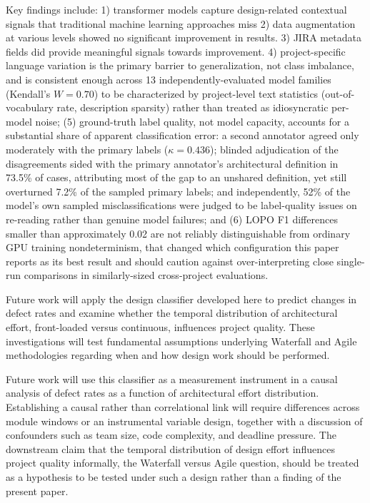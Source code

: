 \documentclass[preprint,12pt]{elsarticle}
\begin{document}
Key findings include: 1) transformer models capture design-related contextual signals that traditional machine learning approaches miss 2) data augmentation at various levels showed no significant improvement in results. 3) JIRA metadata fields did provide meaningful signals towards improvement. 4) project-specific language variation is the primary barrier to generalization, not class imbalance, and is consistent enough across 13 independently-evaluated model families (Kendall's $W=0.70$) to be characterized by project-level text statistics (out-of-vocabulary rate, description sparsity) rather than treated as idiosyncratic per-model noise; (5) ground-truth label quality, not model capacity, accounts for a substantial share of apparent classification error: a second annotator agreed only moderately with the primary labels ($\kappa=0.436$); blinded adjudication of the disagreements sided with the primary annotator's architectural definition in 73.5\% of cases, attributing most of the gap to an unshared definition, yet still overturned 7.2\% of the sampled primary labels; and independently, 52\% of the model's own sampled misclassifications were judged to be label-quality issues on re-reading rather than genuine model failures; and (6) LOPO F1 differences smaller than approximately 0.02 are not reliably distinguishable from ordinary GPU training nondeterminism, that changed which configuration this paper reports as its best result and should caution against over-interpreting close single-run comparisons in similarly-sized cross-project evaluations.

Future work will apply the design classifier developed here to predict changes in defect rates and examine whether the temporal distribution of architectural effort, front-loaded versus continuous, influences project quality. These investigations will test fundamental assumptions underlying Waterfall and Agile methodologies regarding when and how design work should be performed.

Future work will use this classifier as a measurement instrument in a causal analysis of defect rates as a function of architectural effort distribution. Establishing a causal rather than correlational link will require differences across module windows or an instrumental variable design, together with a discussion of confounders such as team size, code complexity, and deadline pressure. The downstream claim that the temporal distribution of design effort influences project quality informally, the Waterfall versus Agile question, should be treated as a hypothesis to be tested under such a design rather than a finding of the present paper.
\end{document}
